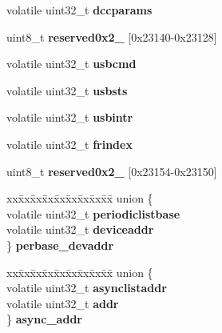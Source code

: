 \begin{DoxyCompactItemize}
volatile uint32\+\_\+t {\bfseries dccparams}
\item 
\mbox{\label{structm83xxUSB__DRRegisters___a1c69c793e973ea3111df975c2aac9529}} 
uint8\+\_\+t {\bfseries reserved0x2\+\_} \mbox{[}0x23140-\/0x23128\mbox{]}
\item 
\mbox{\label{structm83xxUSB__DRRegisters___afe5e9383cffc1a172833573ab5758240}} 
volatile uint32\+\_\+t {\bfseries usbcmd}
\item 
\mbox{\label{structm83xxUSB__DRRegisters___a4c51e02944246364159d8d5f3de4c3cc}} 
volatile uint32\+\_\+t {\bfseries usbsts}
\item 
\mbox{\label{structm83xxUSB__DRRegisters___aabf390bc5d67216a61abeca01a56e2a1}} 
volatile uint32\+\_\+t {\bfseries usbintr}
\item 
\mbox{\label{structm83xxUSB__DRRegisters___a9c9091893683baec719ec316162ac98b}} 
volatile uint32\+\_\+t {\bfseries frindex}
\item 
\mbox{\label{structm83xxUSB__DRRegisters___a8496b9c89bce48f0d406e2f1580f5ebc}} 
uint8\+\_\+t {\bfseries reserved0x2\+\_} \mbox{[}0x23154-\/0x23150\mbox{]}
\item 
\mbox{\label{structm83xxUSB__DRRegisters___a7ff18b054e1fc2318d7e88d4e5fcd282}} 
\begin{tabbing}
xx\=xx\=xx\=xx\=xx\=xx\=xx\=xx\=xx\=\kill
union \{\\
\>volatile uint32\_t {\bfseries periodiclistbase}\\
\>volatile uint32\_t {\bfseries deviceaddr}\\
\} {\bfseries perbase\_devaddr}\\

\end{tabbing}\item 
\mbox{\label{structm83xxUSB__DRRegisters___a8c08f21e4c7381669da90e1df331a3f3}} 
\begin{tabbing}
xx\=xx\=xx\=xx\=xx\=xx\=xx\=xx\=xx\=\kill
union \{\\
\>volatile uint32\_t {\bfseries asynclistaddr}\\
\>volatile uint32\_t {\bfseries addr}\\
\} {\bfseries async\_addr}\\


\end{tabbing}
\end{DoxyCompactItemize}
